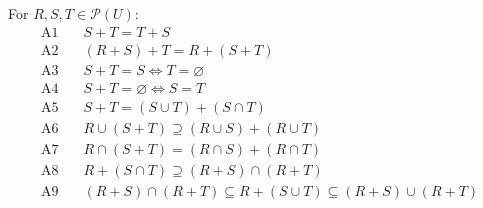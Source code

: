 For $R, S, T \in \mathcal{P}(U)$:
\begin{align*}
\text{A1}&\quad S + T = T + S \\
\text{A2}&\quad (R + S) + T = R + (S + T) \\
\text{A3}&\quad S + T = S \Leftrightarrow T = \varnothing \\
\text{A4}&\quad S + T = \varnothing \Leftrightarrow S = T \\
\text{A5}&\quad S + T = (S \cup T) + (S \cap T) \\
\text{A6}&\quad R \cup (S + T) \supseteq (R \cup S) + (R \cup T) \\
\text{A7}&\quad R \cap (S + T) = (R \cap S) + (R \cap T) \\
\text{A8}&\quad R + (S \cap T) \supseteq (R + S) \cap (R + T) \\
\text{A9}&\quad (R + S) \cap (R + T) \subseteq R + (S \cup T) \subseteq (R + S) \cup (R + T)
\end{align*}
